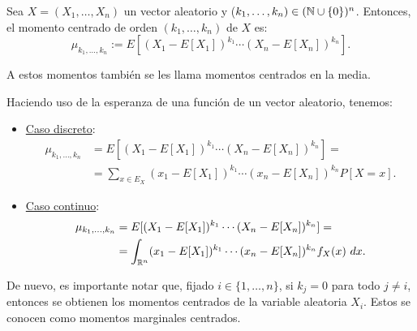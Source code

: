 \begin{definicion}
    Sea $X=(X_1,\dots,X_n)$ un vector aleatorio y ($k_1,\dots,k_n)\in (\mathbb{N}\cup \{0\})^n$. Entonces, el momento centrado de orden $(k_1,\dots,k_n)$ de $X$ es:
    \begin{equation*}
        \mu_{k_1,\dots,k_n} := E[(X_1-E[X_1])^{k_1}\cdots (X_n-E[X_n])^{k_n}].
    \end{equation*}

    A estos momentos también se les llama momentos centrados en la media.
\end{definicion}

Haciendo uso de la esperanza de una función de un vector aleatorio, tenemos:
\begin{itemize}
    \item \ul{Caso discreto}:
    \begin{align*}
        \mu_{k_1,\dots,k_n}&=E[(X_1-E[X_1])^{k_1}\cdots (X_n-E[X_n])^{k_n}] =\\&= \sum_{x\in E_X} (x_1-E[X_1])^{k_1}\cdots (x_n-E[X_n])^{k_n}
        P[X=x].
    \end{align*}

    \item \ul{Caso continuo}:
    \begin{align*}
        \mu_{k_1,\dots,k_n}&=E[(X_1-E[X_1])^{k_1}\cdots (X_n-E[X_n])^{k_n}] =\\&= \int_{\mathbb{R}^n} (x_1-E[X_1])^{k_1}\cdots (x_n-E[X_n])^{k_n} f_X(x)~d x.
    \end{align*}
\end{itemize}

De nuevo, es importante notar que, fijado $i\in \{1,\dots,n\}$, si $k_j=0$ para todo $j\neq i$, entonces se obtienen los momentos centrados de la variable aleatoria $X_i$. Estos se conocen como momentos marginales centrados.\\

